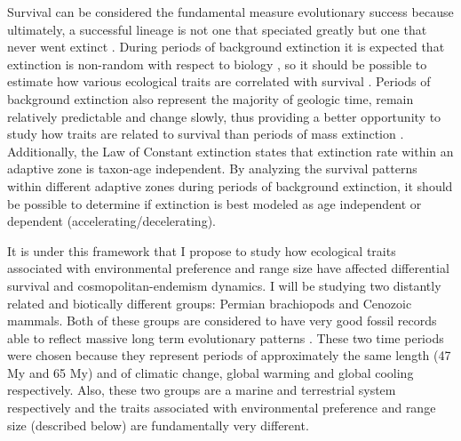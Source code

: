 \documentclass[12pt,letterpaper]{article}
\begin{document}
Survival can be considered the fundamental measure evolutionary success because ultimately, a successful lineage is not one that speciated greatly but one that never went extinct \citep{Cooper1984,Palmer2012}. During periods of background extinction it is expected that extinction is non-random with respect to biology \citep{Jablonski1986}, so it should be possible to estimate how various ecological traits are correlated with survival \citep{Kitchell1990,Kitchell1985a}. Periods of background extinction also represent the majority of geologic time, remain relatively predictable and change slowly, thus providing a better opportunity to study how traits are related to survival than periods of mass extinction \citep{Jablonski1986,Raup1988}. Additionally, the Law of Constant extinction \citep{VanValen1973} states that extinction rate within an adaptive zone is taxon-age independent. By analyzing the survival patterns within different adaptive zones during periods of background extinction, it should be possible to determine if extinction is best modeled as age independent or dependent (accelerating/decelerating).

It is under this framework that I propose to study how ecological traits associated with environmental preference and range size have affected differential survival and cosmopolitan-endemism dynamics. I will be studying two distantly related and biotically different groups: Permian brachiopods and Cenozoic mammals. Both of these groups are considered to have very good fossil records able to reflect massive long term evolutionary patterns \citep{Mark1977}. These two time periods were chosen because they represent periods of approximately the same length (47 My and 65 My) and of climatic change, global warming and global cooling respectively. Also, these two groups are a marine and terrestrial system respectively and the traits associated with environmental preference and range size (described below) are fundamentally very different. 
\end{document}

